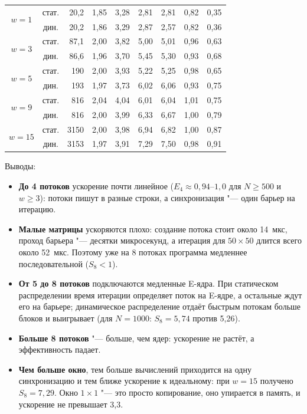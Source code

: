 \documentclass[12pt,a4paper]{article}
\begin{document}
\begin{table}[H]
\begin{tabular}{|c|c|r|c|c|c|c||c|c|}
\hline
\multirow{2}{*}{$w = 1$} & стат. & 20{,}2 & 1{,}85 & 3{,}28 & 2{,}81 & 2{,}81 & 0{,}82 & 0{,}35 \\
 & дин. & 20{,}2 & 1{,}86 & 3{,}29 & 2{,}87 & 2{,}57 & 0{,}82 & 0{,}36 \\
\hline
\multirow{2}{*}{$w = 3$} & стат. & 87{,}1 & 2{,}00 & 3{,}82 & 5{,}00 & 5{,}01 & 0{,}96 & 0{,}63 \\
 & дин. & 86{,}6 & 1{,}96 & 3{,}70 & 5{,}45 & 5{,}30 & 0{,}93 & 0{,}68 \\
\hline
\multirow{2}{*}{$w = 5$} & стат. & 190 & 2{,}00 & 3{,}93 & 5{,}22 & 5{,}25 & 0{,}98 & 0{,}65 \\
 & дин. & 193 & 1{,}97 & 3{,}73 & 6{,}02 & 6{,}06 & 0{,}93 & 0{,}75 \\
\hline
\multirow{2}{*}{$w = 9$} & стат. & 816 & 2{,}04 & 4{,}04 & 6{,}01 & 6{,}04 & 1{,}01 & 0{,}75 \\
 & дин. & 816 & 2{,}00 & 3{,}99 & 6{,}33 & 6{,}67 & 1{,}00 & 0{,}79 \\
\hline
\multirow{2}{*}{$w = 15$} & стат. & 3150 & 2{,}00 & 3{,}98 & 6{,}94 & 6{,}82 & 1{,}00 & 0{,}87 \\
 & дин. & 3153 & 1{,}97 & 3{,}91 & 7{,}29 & 7{,}50 & 0{,}98 & 0{,}91 \\
\hline
\end{tabular}
\end{table}

Выводы:
\begin{itemize}
    \item \textbf{До 4 потоков} ускорение почти линейное ($E_4 \approx 0{,}94$--$1{,}0$
          для $N \ge 500$ и $w \ge 3$): потоки пишут в разные строки, а
          синхронизация "--- один барьер на итерацию.
    \item \textbf{Малые матрицы} ускоряются плохо: создание потока стоит
          около 14~мкс, проход барьера "--- десятки микросекунд, а итерация для
          $50 \times 50$ длится всего около 52~мкс. Поэтому уже на 8 потоках
          программа медленнее последовательной ($S_8 < 1$).
    \item \textbf{От 5 до 8 потоков} подключаются медленные E-ядра. При
          статическом распределении время итерации определяет поток на
          E-ядре, а остальные ждут его на барьере; динамическое распределение
          отдаёт быстрым потокам больше блоков и выигрывает
          (для $N = 1000$: $S_8 = 5{,}74$ против 5{,}26).
    \item \textbf{Больше 8 потоков} "--- больше, чем ядер: ускорение не растёт,
          а эффективность падает.
    \item \textbf{Чем больше окно}, тем больше вычислений приходится на одну
          синхронизацию и тем ближе ускорение к идеальному: при $w = 15$
          получено $S_8 = 7{,}29$. Окно $1 \times 1$ "--- это просто копирование, оно
          упирается в память, и ускорение не превышает 3{,}3.
\end{itemize}
\end{document}
